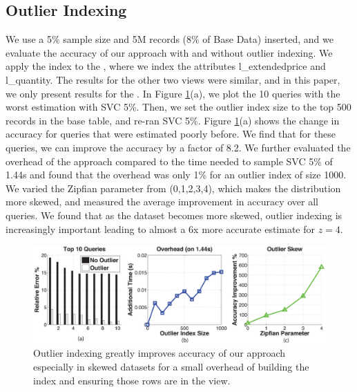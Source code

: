 \subsection{Outlier Indexing}

\sloppy

We use a 5\% sample size and 5M records (8\% of Base Data) inserted, and we evaluate the accuracy of our approach with and without outlier indexing.
We apply the index to the \spview, where we index the attributes l\_extendedprice and l\_quantity.
The results for the other two views were similar, and in this paper, we only present results for the \spview.
In Figure \ref{exp7outlier}(a), we plot the 10 queries with the worst estimation with SVC 5\%.
Then, we set the outlier index size to the top 500 records in the base table, and re-ran SVC 5\%.
Figure \ref{exp7outlier}(a) shows the change in accuracy for queries that were estimated poorly before.
We find that for these queries, we can improve the accuracy by a factor of 8.2.
We further evaluated the overhead of the approach compared to the time needed to sample SVC 5\% of 1.44s and found that the overhead was only 1\% for an outlier index of size 1000.
We varied the Zipfian parameter from (0,1,2,3,4), which makes the distribution more skewed, and measured the average improvement in accuracy over all queries.
We found that as the dataset becomes more skewed, outlier indexing is increasingly important leading to almost a 6x more accurate estimate for $z=4$.

\fussy

\begin{figure}[ht!]
\includegraphics[trim = 45mm 0mm 45mm 0mm, clip,width=\columnwidth]{exp/exp7-outlier.eps}\vspace{-1em}
 \caption{Outlier indexing greatly improves accuracy of our approach especially in skewed datasets for a small overhead of building the index and ensuring those rows are in the view.\label{exp7outlier}}\vspace{-1em}
\end{figure}

